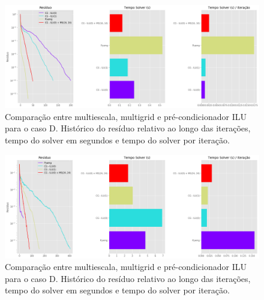 
\begin{figure}[!htbp]
\label{fig:casoD_2}
\centering
\includegraphics[width=\textwidth]{chap08/figs/casoD_2.png}
\caption{Comparação entre multiescala, multigrid e pré-condicionador ILU para o caso D. Histórico do resíduo relativo ao longo das iterações, tempo do solver em segundos e tempo do solver por iteração. }
\end{figure}


\begin{figure}[!htbp]
\label{fig:casoE_2}
\centering
\includegraphics[width=\textwidth]{chap08/figs/casoE_2.png}
\caption{Comparação entre multiescala, multigrid e pré-condicionador ILU para o caso D. Histórico do resíduo relativo ao longo das iterações, tempo do solver em segundos e tempo do solver por iteração. }
\end{figure}
